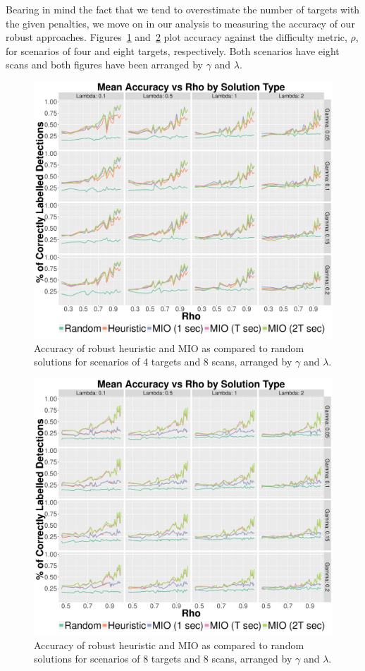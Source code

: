 Bearing in mind the fact that we tend to overestimate the number of targets with the given penalties, we move on in our analysis to measuring the accuracy of our robust approaches. Figures~\ref{fig:Robust_4_8_Accuracy} and~\ref{fig:Robust_8_8_Accuracy} plot accuracy against the difficulty metric, $\rho$, for scenarios of four and eight targets, respectively. Both scenarios have eight scans and both figures have been arranged by $\gamma$ and $\lambda$.
\begin{figure}[ht]
  \centering
  \includegraphics[width=\columnwidth]{../Figures/4_8_Accuracy}
  \caption{Accuracy of robust heuristic and MIO as compared to random solutions for scenarios of 4 targets and 8 scans, arranged by $\gamma$ and $\lambda$.}
  \label{fig:Robust_4_8_Accuracy}
\end{figure}
\begin{figure}[ht]
  \centering
  \includegraphics[width=\columnwidth]{../Figures/8_8_Accuracy}
  \caption{Accuracy of robust heuristic and MIO as compared to random solutions for scenarios of 8 targets and 8 scans, arranged by $\gamma$ and $\lambda$.}
  \label{fig:Robust_8_8_Accuracy}
\end{figure}

